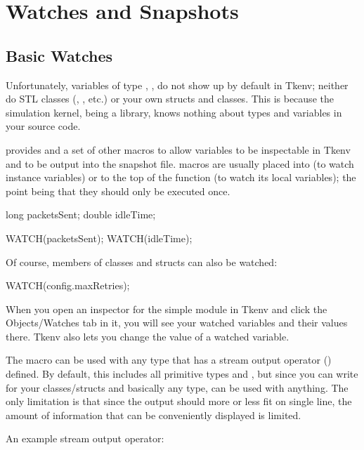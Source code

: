 \section{Watches and Snapshots}

\subsection{Basic Watches}

Unfortunately, variables of type , , 
do not show up by default in Tkenv; neither do STL classes
(, , etc.) or your own structs and
classes. This is because the simulation kernel, being a library, knows
nothing about types and variables in your source code.

{\opp} provides  and a set of other macros to
allow variables to be inspectable in Tkenv and to be output into the snapshot
file.  macros are usually placed into
 (to watch instance variables) or to the top of the
 function (to watch its local variables); the point being
that they should only be executed once.

\begin{cpp}
long packetsSent;
double idleTime;

WATCH(packetsSent);
WATCH(idleTime);
\end{cpp}

Of course, members of classes and structs can also be watched:

\begin{cpp}
WATCH(config.maxRetries);
\end{cpp}

When you open an inspector for the simple module in Tkenv and click
the Objects/Watches tab in it, you will see your watched variables
and their values there. Tkenv also lets you change the value of a
watched variable.

The  macro can be used with any type that has a
stream output operator () defined. By default,
this includes all primitive types and , but since
you can write  for your classes/structs and basically
any type,  can be used with anything. The only limitation
is that since the output should more or less fit on single line, the
amount of information that can be conveniently displayed is limited.

An example stream output operator:

